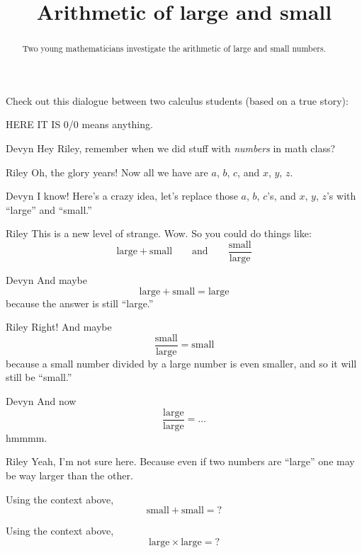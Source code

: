 \documentclass{ximera}
\title[Break-Ground:]{Arithmetic of large and small}
\begin{document}
\begin{abstract}
Two young mathematicians investigate the arithmetic of large
and small numbers.
\end{abstract}
\maketitle


Check out this dialogue between two calculus students (based on a true
story):


HERE IT IS 0/0 means anything.


\begin{dialogue}
\item[Devyn] Hey Riley, remember when we did stuff with
  \textit{numbers} in math class?
\item[Riley] Oh, the glory years! Now all we have are $a$, $b$, $c$, and $x$, $y$, $z$.
\item[Devyn] I know! Here's a crazy idea, let's replace those $a$,
  $b$, $c$'s, and $x$, $y$, $z$'s with ``large'' and ``small.''
\item[Riley] This is a new level of strange. Wow. So you could do things like:
  \[
  \text{large}+\text{small}\qquad\text{and}\qquad \frac{\text{small}}{\text{large}}
  \]
\item[Devyn] And maybe
  \[
  \text{large}+\text{small} = \text{large}
  \]
  because the answer is still ``large.''
\item[Riley] Right! And maybe
  \[
  \frac{\text{small}}{\text{large}} = \text{small}
  \]
  because a small number divided by a large number is even smaller, and so it will still be ``small.''
\item[Devyn] And now
  \[
  \frac{\text{large}}{\text{large}} = \dots
  \]
  hmmmm.
  \item[Riley] Yeah, I'm not sure here. Because even if two numbers are
    ``large'' one may be way larger than the other.
\end{dialogue}



\begin{problem}
  Using the context above, 
  \[
  \text{small}+\text{small} = ?
  \]
  \begin{multipleChoice}
  \end{multipleChoice}
\end{problem}


\begin{problem}
  Using the context above, 
  \[
  \text{large}\times\text{large} = ?
  \]
  \begin{multipleChoice}
  \end{multipleChoice}
\end{problem}
\end{document}
